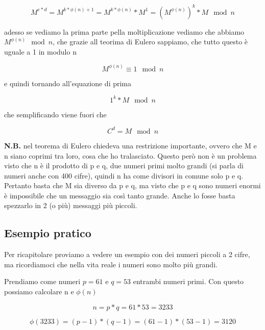 \documentclass{rapport}
\begin{document}
\begin{equation*}
    M^{e*d} = M^{k*\phi(n) + 1}  = M^{k*\phi(n)} * M^1   =  (M^{\phi(n)})^k * M  \mod n
\end{equation*}

adesso se vediamo la prima parte pella moltiplicazione vediamo che abbiamo $M^{\phi(n)} \mod n$, che  grazie all teorima di Eulero sappiamo, che tutto questo è uguale a 1 in modulo n

\begin{equation*}
   M^{\phi(n)} \equiv 1 \mod n
\end{equation*}

e quindi tornando all'equazione di prima 

\begin{equation*}
   1^k * M \mod n
\end{equation*}

che semplificando viene fuori che 

\begin{equation*}
   C^d =  M \mod n
\end{equation*}



\textbf{N.B.} nel teorema di Eulero chiedeva una restrizione importante, ovvero che M e n siano coprimi tra loro, cosa che ho tralasciato. Questo però non è un problema visto che n è il prodotto di p e q, due numeri primi molto grandi (si parla di numeri anche con 400 cifre), quindi n ha come divisori in comune solo p e q. Pertanto basta che M sia diverso da p e q, ma visto che p e q sono numeri enormi è impossibile che un messaggio sia così tanto grande. Anche lo fosse basta spezzarlo in 2 (o più) messaggi più piccoli.



\newpage
\subsection{Esempio pratico}
Per ricapitolare proviamo a vedere un esempio con dei numeri piccoli a 2 cifre, ma ricordiamoci che nella vita reale i numeri sono molto più grandi.

Prendiamo come numeri $p=61$ e $q=53$ entrambi numeri primi. Con questo possiamo calcolare n e $\phi(n)$

\begin{equation*}
   n = p * q = 61 * 53 = 3233
\end{equation*}

\begin{equation*}
   \phi(3233) = (p -1 ) * (q -1 ) = (61 - 1) * (53 -1) = 3120
\end{equation*}
\end{document}
